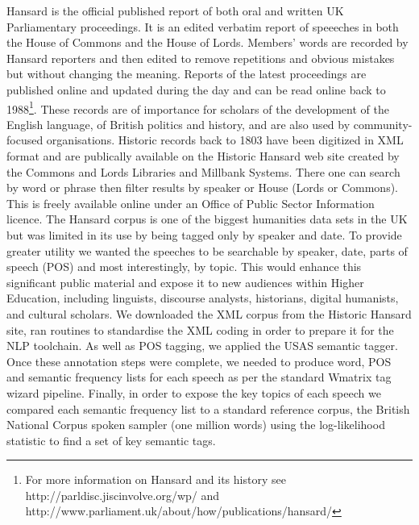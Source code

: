 Hansard is the official published report of both oral and written UK Parliamentary proceedings. It is an edited verbatim report of speeeches in both the House of Commons and the House of Lords. Members' words are recorded by Hansard reporters and then edited to remove repetitions and obvious mistakes but without changing the meaning. Reports of the latest proceedings are published online and updated during the day and can be read online back to 1988\footnote{For more information on Hansard and its history see http://parldisc.jiscinvolve.org/wp/ and http://www.parliament.uk/about/how/publications/hansard/}. 
These records are of importance for scholars of the development of the English language, of British politics and history, and are also used by community-focused organisations.  Historic records back to 1803 have been digitized in XML format and are publically available on the Historic Hansard web site created by the Commons and Lords Libraries and Millbank Systems. There one can search by word or phrase then filter results by speaker or House (Lords or Commons). This is freely available online under an Office of Public Sector Information licence. 
The Hansard corpus is one of the biggest humanities data sets in the UK but was limited in its use by being tagged only by speaker and date. To provide greater utility we wanted the speeches to be searchable by speaker, date, parts of speech (POS) and most interestingly, by topic. This would enhance this significant public material and expose it to new audiences within Higher Education, including linguists, discourse analysts, historians, digital humanists, and cultural scholars. 
We downloaded the XML corpus from the Historic Hansard site, ran routines to standardise the XML coding in order to prepare it for the NLP toolchain. As well as POS tagging, we applied the USAS semantic tagger. Once these annotation steps were complete, we needed to produce word, POS and semantic frequency lists for each speech as per the standard Wmatrix tag wizard pipeline. Finally, in order to expose the key topics of each speech we compared each semantic frequency list to a standard reference corpus, the British National Corpus spoken sampler (one million words) using the log-likelihood statistic to find a set of key semantic tags.





